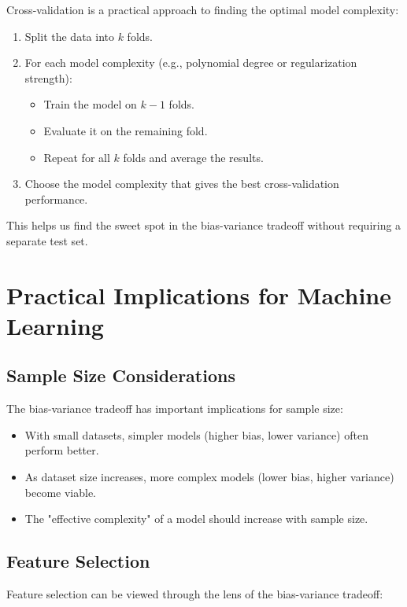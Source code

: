 \documentclass{article}
\begin{document}
Cross-validation is a practical approach to finding the optimal model complexity:

\begin{enumerate}
\item Split the data into $k$ folds.
\item For each model complexity (e.g., polynomial degree or regularization strength):
  \begin{itemize}
  \item Train the model on $k-1$ folds.
  \item Evaluate it on the remaining fold.
  \item Repeat for all $k$ folds and average the results.
  \end{itemize}
\item Choose the model complexity that gives the best cross-validation performance.
\end{enumerate}

This helps us find the sweet spot in the bias-variance tradeoff without requiring a separate test set.

\section{Practical Implications for Machine Learning}

\subsection{Sample Size Considerations}

The bias-variance tradeoff has important implications for sample size:

\begin{itemize}
\item With small datasets, simpler models (higher bias, lower variance) often perform better.
\item As dataset size increases, more complex models (lower bias, higher variance) become viable.
\item The "effective complexity" of a model should increase with sample size.
\end{itemize}

\subsection{Feature Selection}

Feature selection can be viewed through the lens of the bias-variance tradeoff:
\end{document}
